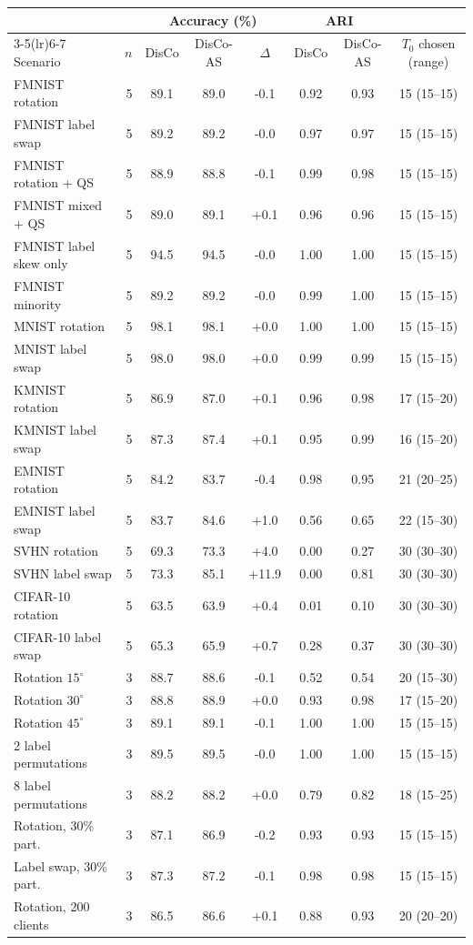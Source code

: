 \scriptsize
\setlength{\tabcolsep}{3pt}
\begin{tabular}{lrcccccc}
\toprule
 & & \multicolumn{3}{c}{Accuracy (\%)} & \multicolumn{2}{c}{ARI} & \\
\cmidrule(lr){3-5}\cmidrule(lr){6-7}
Scenario & $n$ & DisCo & DisCo-AS & $\Delta$ & DisCo & DisCo-AS & $T_0$ chosen (range) \\
\midrule
FMNIST rotation & 5 & 89.1 & 89.0 & -0.1 & 0.92 & 0.93 & 15 (15--15) \\
FMNIST label swap & 5 & 89.2 & 89.2 & -0.0 & 0.97 & 0.97 & 15 (15--15) \\
FMNIST rotation + QS & 5 & 88.9 & 88.8 & -0.1 & 0.99 & 0.98 & 15 (15--15) \\
FMNIST mixed + QS & 5 & 89.0 & 89.1 & +0.1 & 0.96 & 0.96 & 15 (15--15) \\
FMNIST label skew only & 5 & 94.5 & 94.5 & -0.0 & 1.00 & 1.00 & 15 (15--15) \\
FMNIST minority & 5 & 89.2 & 89.2 & -0.0 & 0.99 & 1.00 & 15 (15--15) \\
MNIST rotation & 5 & 98.1 & 98.1 & +0.0 & 1.00 & 1.00 & 15 (15--15) \\
MNIST label swap & 5 & 98.0 & 98.0 & +0.0 & 0.99 & 0.99 & 15 (15--15) \\
KMNIST rotation & 5 & 86.9 & 87.0 & +0.1 & 0.96 & 0.98 & 17 (15--20) \\
KMNIST label swap & 5 & 87.3 & 87.4 & +0.1 & 0.95 & 0.99 & 16 (15--20) \\
EMNIST rotation & 5 & 84.2 & 83.7 & -0.4 & 0.98 & 0.95 & 21 (20--25) \\
EMNIST label swap & 5 & 83.7 & 84.6 & +1.0 & 0.56 & 0.65 & 22 (15--30) \\
SVHN rotation & 5 & 69.3 & 73.3 & +4.0 & 0.00 & 0.27 & 30 (30--30) \\
SVHN label swap & 5 & 73.3 & 85.1 & +11.9 & 0.00 & 0.81 & 30 (30--30) \\
CIFAR-10 rotation & 5 & 63.5 & 63.9 & +0.4 & 0.01 & 0.10 & 30 (30--30) \\
CIFAR-10 label swap & 5 & 65.3 & 65.9 & +0.7 & 0.28 & 0.37 & 30 (30--30) \\
Rotation $15^\circ$ & 3 & 88.7 & 88.6 & -0.1 & 0.52 & 0.54 & 20 (15--30) \\
Rotation $30^\circ$ & 3 & 88.8 & 88.9 & +0.0 & 0.93 & 0.98 & 17 (15--20) \\
Rotation $45^\circ$ & 3 & 89.1 & 89.1 & -0.1 & 1.00 & 1.00 & 15 (15--15) \\
2 label permutations & 3 & 89.5 & 89.5 & -0.0 & 1.00 & 1.00 & 15 (15--15) \\
8 label permutations & 3 & 88.2 & 88.2 & +0.0 & 0.79 & 0.82 & 18 (15--25) \\
Rotation, 30\% part. & 3 & 87.1 & 86.9 & -0.2 & 0.93 & 0.93 & 15 (15--15) \\
Label swap, 30\% part. & 3 & 87.3 & 87.2 & -0.1 & 0.98 & 0.98 & 15 (15--15) \\
Rotation, 200 clients & 3 & 86.5 & 86.6 & +0.1 & 0.88 & 0.93 & 20 (20--20) \\
\bottomrule
\end{tabular}
